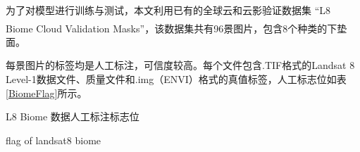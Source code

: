 \documentclass[10pt]{ctexart}
\newcommand{\upcite}[1]{\textsuperscript{\textsuperscript{\cite{#1}}}}
\begin{document}
\begin{multicols}{2}
\begin{table}[H]
    \centering
    \label{landsatBand}
    \end{table}


为了对模型进行训练与测试，本文利用已有的全球云和云影验证数据集
“L8 Biome Cloud Validation Masks”\upcite{foga2017cloud_data}，该数据集共有96景图片，包含8个种类的下垫面。%


每景图片的标签均是人工标注，可信度较高。每个文件包含.TIF格式的Landsat 8 Level-1数据文件、质量文件和.img（ENVI）格式的真值标签，人工标志位如表\ref{BiomeFlag}所示。

\begin{table}[H]
    \caption{L8 Biome 数据人工标注标志位}
    \addtocounter{table}{-1}
    \vspace{-5pt}
    \renewcommand{\tablename}{Tab}
    \caption{flag of landsat8 biome}
    \renewcommand{\tablename}{表}
    \vspace{5pt}


\end{table}
\end{multicols}
\end{document}
